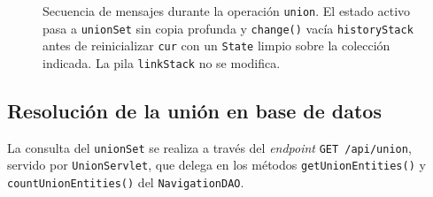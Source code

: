 \begin{figure}[H]
  \centering
  \caption[Diagrama de secuencia de \texttt{union}]{Secuencia de
  mensajes durante la operación \texttt{union}. El estado activo
  pasa a \texttt{unionSet} sin copia profunda y \texttt{change()}
  vacía \texttt{historyStack} antes de reinicializar \texttt{cur} con
  un \texttt{State} limpio sobre la colección indicada. La pila
  \texttt{linkStack} no se modifica.}
  \label{fig:seqUnion}
\end{figure}

    \subsection{Resolución de la unión en base de datos}

La consulta del \texttt{unionSet} se realiza a través del \textit{endpoint}
\texttt{GET /api/union}, servido por \texttt{UnionServlet}, que delega en los métodos
\texttt{getUnionEntities()} y \texttt{countUnionEntities()} del \texttt{NavigationDAO}.

